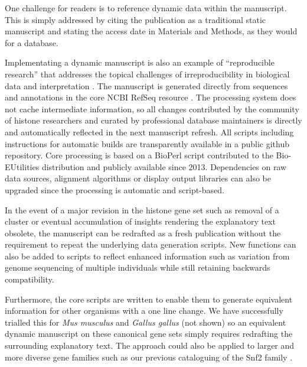   One challenge for readers is to reference dynamic data within the manuscript.
  This is simply addressed by citing the publication as a traditional static manuscript
  and stating the access date in Materials and Methods, as they would for a database.

  Implementating a dynamic manuscript is also an example of ``reproducible research''
  \citep{reproducible-research-bioinformatics,reproducible-research-law}
  that addresses the topical challenges of irreproducibility in biological data
  and interpretation \citep{ErrorProne2012,OpenPrograms2012}.
  The manuscript is generated directly from sequences and annotations
  in the core NCBI RefSeq resource \citep{PruittRefseq2014}.
  The processing system does not cache intermediate information,
  so all changes contributed by the community of histone researchers
  and curated by professional database maintainers
  is directly and automatically reflected in the next manuscript refresh.
  All scripts including instructions for automatic builds
  are transparently available in a public github repository.
  Core processing is based on a BioPerl script contributed to the Bio-EUtilities distribution
  and publicly available since 2013.
  Dependencies on raw data sources, alignment algorithms or display output libraries
  can also be upgraded since the processing is automatic and script-based.

  In the event of a major revision in the histone gene set such as removal of a cluster
  or eventual accumulation of insights rendering the explanatory text obsolete,
  the manuscript can be redrafted as a fresh publication
  without the requirement to repeat the underlying data generation scripts.
  New functions can also be added to scripts to reflect enhanced information
  such as variation from genome sequencing of multiple individuals
  while still retaining backwards compatibility.

  Furthermore, the core scripts are written to enable them to generate
  equivalent information for other organisms with a one line change.
  We have successfully trialled this for \textit{Mus musculus}
  and \textit{Gallus gallus} (not shown)
  so an equivalent dynamic manuscript on these canonical gene sets
  simply requires redrafting the surrounding explanatory text.
  The approach could also be applied to larger and more diverse gene families such as
  our previous cataloguing of the Snf2 family \citep{andrew-snf2-catalogue}.
